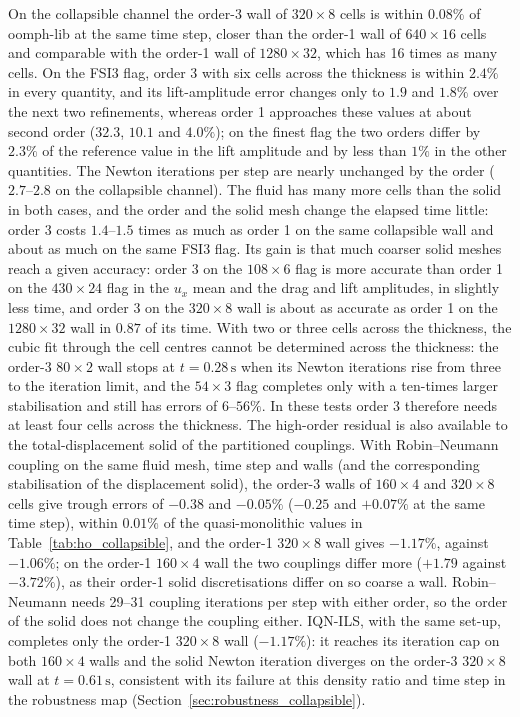 On the collapsible channel the order-3 wall of $320\times8$ cells is within $0.08\%$ of oomph-lib at the same time step, closer than the order-1 wall of $640\times16$ cells and comparable with the order-1 wall of $1280\times32$, which has 16 times as many cells.
On the FSI3 flag, order 3 with six cells across the thickness is within $2.4\%$ in every quantity, and its lift-amplitude error changes only to $1.9$ and $1.8\%$ over the next two refinements, whereas order 1 approaches these values at about second order ($32.3$, $10.1$ and $4.0\%$); on the finest flag the two orders differ by $2.3\%$ of the reference value in the lift amplitude and by less than $1\%$ in the other quantities.
The Newton iterations per step are nearly unchanged by the order ($2.7$--$2.8$ on the collapsible channel).
The fluid has many more cells than the solid in both cases, and the order and the solid mesh change the elapsed time little: order 3 costs $1.4$--$1.5$ times as much as order 1 on the same collapsible wall and about as much on the same FSI3 flag.
Its gain is that much coarser solid meshes reach a given accuracy: order 3 on the $108\times6$ flag is more accurate than order 1 on the $430\times24$ flag in the $u_x$ mean and the drag and lift amplitudes, in slightly less time, and order 3 on the $320\times8$ wall is about as accurate as order 1 on the $1280\times32$ wall in $0.87$ of its time.
With two or three cells across the thickness, the cubic fit through the cell centres cannot be determined across the thickness: the order-3 $80\times2$ wall stops at $t = 0.28\,\mathrm{s}$ when its Newton iterations rise from three to the iteration limit, and the $54\times3$ flag completes only with a ten-times larger stabilisation and still has errors of $6$--$56\%$.
In these tests order 3 therefore needs at least four cells across the thickness.
The high-order residual is also available to the total-displacement solid of the partitioned couplings.
With Robin--Neumann coupling on the same fluid mesh, time step and walls (and the corresponding stabilisation of the displacement solid), the order-3 walls of $160\times4$ and $320\times8$ cells give trough errors of $-0.38$ and $-0.05\%$ ($-0.25$ and $+0.07\%$ at the same time step), within $0.01\%$ of the quasi-monolithic values in Table~\ref{tab:ho_collapsible}, and the order-1 $320\times8$ wall gives $-1.17\%$, against $-1.06\%$; on the order-1 $160\times4$ wall the two couplings differ more ($+1.79$ against $-3.72\%$), as their order-1 solid discretisations differ on so coarse a wall.
Robin--Neumann needs 29--31 coupling iterations per step with either order, so the order of the solid does not change the coupling either.
IQN-ILS, with the same set-up, completes only the order-1 $320\times8$ wall ($-1.17\%$): it reaches its iteration cap on both $160\times4$ walls and the solid Newton iteration diverges on the order-3 $320\times8$ wall at $t = 0.61\,\mathrm{s}$, consistent with its failure at this density ratio and time step in the robustness map (Section~\ref{sec:robustness_collapsible}).
